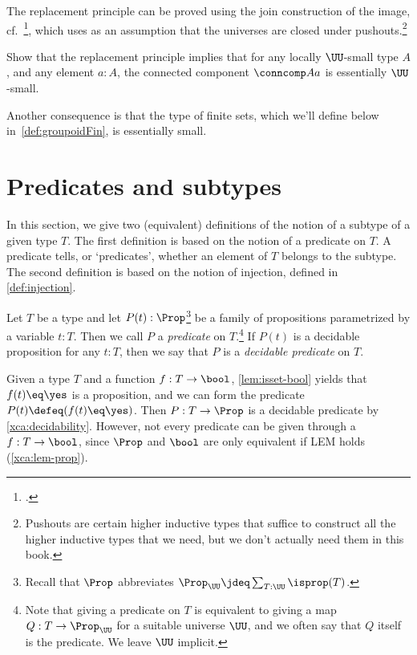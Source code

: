 The replacement principle can be proved using the join construction of the image, cf.~\citeauthor{Rijke-Join}\footcite{Rijke-Join},
which uses as an assumption that the universes
are closed under pushouts.\footnote{%
  Pushouts are certain higher inductive types that suffice
  to construct all the higher inductive types that we need,
  but we don't actually need them in this book.}
\begin{xca}\label{xca:comp-loc-small-ess-small}
  Show that the replacement principle implies that for any locally $\UU$-small type $A$,
  and any element $a:A$,
  the connected component $\conncomp A a$ is essentially $\UU$-small.
\end{xca}
Another consequence is that the type of finite sets, which we'll define below
in~\cref{def:groupoidFin}, is essentially small.


\section{Predicates and subtypes}
\label{sec:subtype}

In this section, we give two (equivalent) definitions of the notion
of a subtype of a given type $T$. The first definition is based
on the notion of a predicate on $T$. A predicate tells, or `predicates',
whether an element of $T$ belongs to the subtype. The second definition
is based on the notion of injection, defined in \cref{def:injection}.

\begin{definition}\label{def:predicate}
  Let $T$ be a type and let $P(t):\Prop$\footnote{%
    Recall that $\Prop$ abbreviates $\Prop_\UU \jdeq \sum_{T:\UU} \isprop(T)$.}
  be a family of propositions parametrized by a variable $t:T$.
  Then we call $P$ a \emph{predicate} on $T$.\footnote{%
    Note that giving a predicate on $T$ is
    equivalent to giving a map $Q: T\to\Prop_\UU$
    for a suitable universe $\UU$, and we often say that $Q$ itself is the
    predicate. We leave $\UU$ implicit.}
  If $P(t)$ is a decidable proposition for any $t:T$,
  then we say that $P$ is a \emph{decidable predicate} on $T$.
\end{definition}

Given a type $T$ and a function $f: T\to\bool$,
\cref{lem:isset-bool} yields that $f(t) \eq \yes$ is a
proposition, and we can form the predicate $P(t)\defeq (f(t) \eq \yes)$.
Then $P: T\to\Prop$ is a decidable predicate by \cref{xca:decidability}. 
However, not every predicate can be given through a $f: T\to\bool$, since
$\Prop$ and $\bool$ are only equivalent if LEM holds (\cref{xca:lem-prop}).

